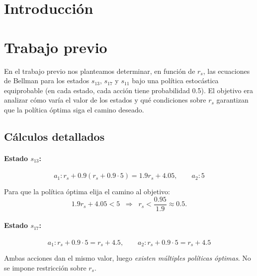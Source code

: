 \documentclass[a4paper,12pt]{article}
\newcommand{\vacio}{\textcolor{white}{ .}}
\begin{document}
\renewcommand{\footrulewidth}{0.5pt}
\fancyfoot[C]{\vacio}


\renewcommand{\contentsname}{Índice}
\tableofcontents
{}

\newpage


\section{Introducción}

\section{Trabajo previo}

En el trabajo previo nos planteamos determinar, en función de $r_s$, las ecuaciones de Bellman 
para los estados $s_{13}$, $s_{17}$ y $s_{11}$ bajo una política estocástica equiprobable 
(en cada estado, cada acción tiene probabilidad 0.5). 
El objetivo era analizar cómo varía el valor de los estados y qué condiciones sobre $r_s$ 
garantizan que la política óptima siga el camino deseado.

\subsection*{Cálculos detallados}

\paragraph{Estado $s_{13}$:}
\[
a_1 : r_s + 0.9(r_s + 0.9 \cdot 5) = 1.9r_s + 4.05,
\qquad
a_2 : 5
\]

Para que la política óptima elija el camino al objetivo:
\[
1.9r_s + 4.05 < 5 \;\;\Rightarrow\;\; r_s < \frac{0.95}{1.9} \approx 0.5.
\]

\paragraph{Estado $s_{17}$:}
\[
a_1 : r_s + 0.9 \cdot 5 = r_s + 4.5,
\qquad
a_2 : r_s + 0.9 \cdot 5 = r_s + 4.5
\]

Ambas acciones dan el mismo valor, luego \emph{existen múltiples políticas óptimas}.
No se impone restricción sobre $r_s$.
\end{document}
